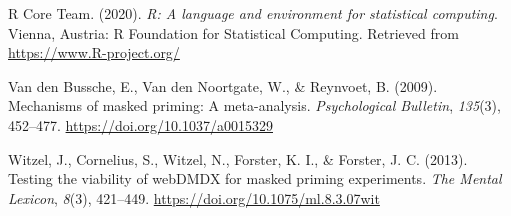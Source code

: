 \documentclass[
  english,
  man]{apa6}
\begin{document}
\leavevmode\hypertarget{ref-R-base}{}%
R Core Team. (2020). \emph{R: A language and environment for statistical computing}. Vienna, Austria: R Foundation for Statistical Computing. Retrieved from \url{https://www.R-project.org/}

\leavevmode\hypertarget{ref-vandenbusscheMechanismsMaskedPriming2009}{}%
Van den Bussche, E., Van den Noortgate, W., \& Reynvoet, B. (2009). Mechanisms of masked priming: A meta-analysis. \emph{Psychological Bulletin}, \emph{135}(3), 452--477. \url{https://doi.org/10.1037/a0015329}

\leavevmode\hypertarget{ref-witzelTestingViabilityWebDMDX2013}{}%
Witzel, J., Cornelius, S., Witzel, N., Forster, K. I., \& Forster, J. C. (2013). Testing the viability of webDMDX for masked priming experiments. \emph{The Mental Lexicon}, \emph{8}(3), 421--449. \url{https://doi.org/10.1075/ml.8.3.07wit}

\endgroup
\end{document}
